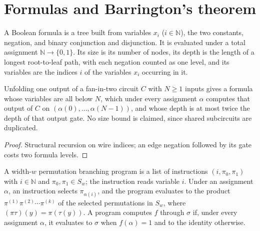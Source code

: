 \section{Formulas and Barrington's theorem}
\label{sec:circuits-barrington}

\begin{definition}
  \label{def:circuits-formula}
  \leanok
  A Boolean formula is a tree built from variables $x_i$ ($i \in \mathbb{N}$),
  the two constants, negation, and binary conjunction and disjunction. It is
  evaluated under a total assignment $\mathbb{N} \to \{0,1\}$. Its size is its
  number of nodes, its depth is the length of a longest root-to-leaf path,
  with each negation counted as one level, and its variables are the indices
  $i$ of the variables $x_i$ occurring in it.
\end{definition}

\begin{lemma}
  \label{lem:circuits-output-formula}
  \leanok
  Unfolding one output of a fan-in-two circuit $C$ with $N \ge 1$ inputs gives
  a formula whose variables are all below $N$, which under every assignment
  $\alpha$ computes that output of $C$ on
  $(\alpha(0), \dots, \alpha(N - 1))$, and whose depth is at most twice the
  depth of that output gate. No size bound is claimed, since shared
  subcircuits are duplicated.
\end{lemma}
\begin{proof}
  \leanok
  Structural recursion on wire indices; an edge negation followed by its gate
  costs two formula levels.
\end{proof}

\begin{definition}
  \label{def:circuits-bp}
  \leanok
  A width-$w$ permutation branching program is a list of instructions
  $(i, \pi_0, \pi_1)$ with $i \in \mathbb{N}$ and $\pi_0, \pi_1 \in S_w$; the
  instruction reads variable $i$. Under an assignment $\alpha$, an instruction
  selects $\pi_{\alpha(i)}$, and the program evaluates to the product
  $\pi^{(1)} \pi^{(2)} \cdots \pi^{(k)}$ of the selected permutations in
  $S_w$, where $(\pi \tau)(y) = \pi(\tau(y))$. A program computes $f$ through
  $\sigma$ if, under every assignment $\alpha$, it evaluates to $\sigma$ when
  $f(\alpha) = 1$ and to the identity otherwise.
\end{definition}

